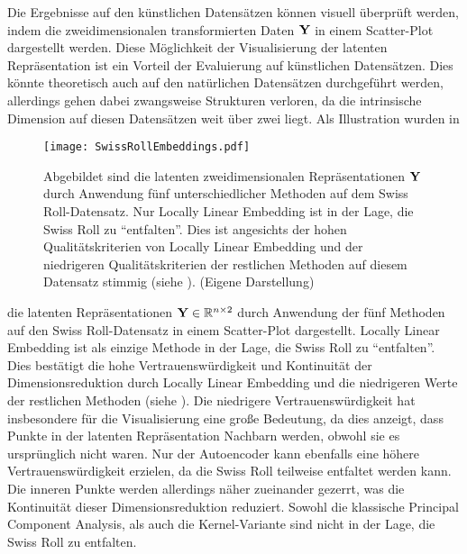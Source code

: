 Die Ergebnisse auf den künstlichen Datensätzen können visuell überprüft werden, indem die
zweidimensionalen transformierten Daten $\mat{Y}$ in einem Scatter-Plot dargestellt werden. Diese
Möglichkeit der Visualisierung der latenten Repräsentation ist ein Vorteil der Evaluierung auf
künstlichen Datensätzen. Dies könnte theoretisch auch auf den natürlichen Datensätzen durchgeführt
werden, allerdings gehen dabei zwangsweise Strukturen verloren, da die intrinsische Dimension auf
diesen Datensätzen weit über zwei liegt. Als Illustration wurden in
\begin{figure}[ht]
	\centering
	\texttt{[image: SwissRollEmbeddings.pdf]}
	\caption[Latente zweidimensionale Repräsentationen  $\mat{Y}$ durch Anwendung fünf unterschiedlicher Methoden auf dem Swiss Roll-Datensatzes]{Abgebildet sind die latenten zweidimensionalen Repräsentationen $\mat{Y}$ durch Anwendung fünf unterschiedlicher Methoden auf dem Swiss Roll-Datensatz. Nur Locally Linear Embedding ist in der Lage, die Swiss Roll zu \enquote{entfalten}. Dies ist angesichts der hohen Qualitätskriterien von Locally Linear Embedding und der niedrigeren Qualitätskriterien der restlichen Methoden auf diesem Datensatz stimmig (siehe ). (Eigene Darstellung)}
	\label{fig:SwissRollEmbeddings}
\end{figure}
die latenten Repräsentationen $\mathbf{Y} \in \mathbb{R}^{n \times 2}$ durch Anwendung der fünf Methoden auf den Swiss Roll-Datensatz in einem Scatter-Plot dargestellt.
Locally Linear Embedding ist als einzige Methode in der Lage, die Swiss Roll zu
\enquote{entfalten}. Dies bestätigt die hohe Vertrauenswürdigkeit und Kontinuität der
Dimensionsreduktion durch Locally Linear Embedding und die niedrigeren Werte der restlichen
Methoden (siehe ). Die niedrigere Vertrauenswürdigkeit hat
insbesondere für die Visualisierung eine große Bedeutung, da dies anzeigt, dass Punkte in der
latenten Repräsentation Nachbarn werden, obwohl sie es ursprünglich nicht waren. Nur der
Autoencoder kann ebenfalls eine höhere Vertrauenswürdigkeit erzielen, da die Swiss Roll teilweise
entfaltet werden kann. Die inneren Punkte werden allerdings näher zueinander gezerrt, was die
Kontinuität dieser Dimensionsreduktion reduziert. Sowohl die klassische Principal Component
Analysis, als auch die Kernel-Variante sind nicht in der Lage, die Swiss Roll zu entfalten.

